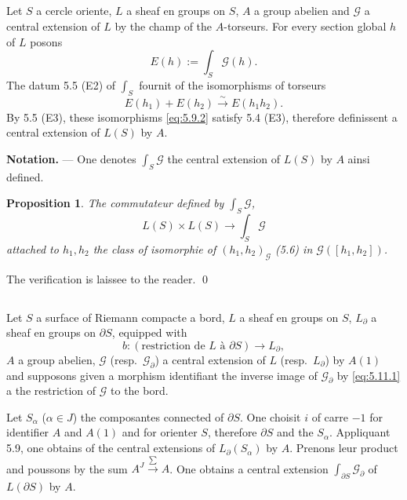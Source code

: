 \documentclass[12pt,a4paper]{article}
\theoremstyle{plain}
\newtheorem{proposition}[theorem]{Proposition}
\theoremstyle{definition}
\theoremstyle{remark}
\begin{document}
\subsection{}

Let $S$ a cercle oriente, $L$ a sheaf en groups on $S$, $A$ a group abelien
and $\mathscr{G}$ a central extension of $L$ by the champ of the $A$-torseurs. For every section global $h$
of $L$ posons
\begin{equation}\label{eq:5.9.1}
E(h) := \int_S \mathscr{G}(h).
\end{equation}
The datum 5.5 (E2) of $\int_S$ fournit of the isomorphisms of torseurs
\begin{equation}\label{eq:5.9.2}
E(h_1) + E(h_2) \xrightarrow{\sim} E(h_1 h_2).
\end{equation}
By 5.5 (E3), these isomorphisms \eqref{eq:5.9.2} satisfy 5.4 (E3), therefore definissent a central extension of $L(S)$ by $A$.

\textbf{Notation.} --- One denotes $\int_S \mathscr{G}$ the central extension of $L(S)$ by $A$ ainsi defined.

\begin{proposition}
The commutateur defined by $\int_S \mathscr{G}$,
\[
L(S) \times L(S) \to \int_S \mathscr{G}
\]
attached to $h_1, h_2$ the class of isomorphie of $(h_1, h_2)_\mathscr{G}$ \emph{(5.6)} in $\mathscr{G}([h_1, h_2])$.
\end{proposition}

The verification is laissee to the reader.
\qed

\subsection{}

Let $S$ a surface of Riemann compacte a bord, $L$ a sheaf en groups
on $S$, $L_\partial$ a sheaf en groups on $\partial S$, equipped with
\begin{equation}\label{eq:5.11.1}
b : (\text{restriction de } L \text{ à } \partial S) \to L_\partial,
\end{equation}
$A$ a group abelien, $\mathscr{G}$ (resp.~$\mathscr{G}_\partial$) a central extension of $L$ (resp.~$L_\partial$) by $A(1)$ and
supposons given a morphism identifiant the inverse image of $\mathscr{G}_\partial$ by \eqref{eq:5.11.1} a the
restriction of $\mathscr{G}$ to the bord.

Let $S_\alpha$ ($\alpha \in J$) the composantes connected of $\partial S$. One choisit $i$ of carre $-1$ for
identifier $A$ and $A(1)$ and for orienter $S$, therefore $\partial S$ and the $S_\alpha$. Appliquant 5.9, one obtains
of the central extensions of $L_\partial(S_\alpha)$ by $A$. Prenons leur product and poussons by the sum
$A^J \xrightarrow{\sum} A$. One obtains a central extension $\int_{\partial S} \mathscr{G}_\partial$ of $L(\partial S)$ by $A$.
\end{document}
